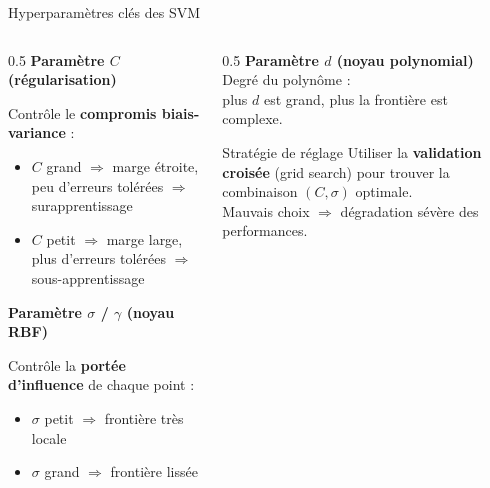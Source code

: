 \documentclass[11pt]{beamer}
\begin{document}
\begin{frame}{Hyperparamètres clés des SVM}
    \small
    \begin{columns}[T]
    \begin{column}{0.5\textwidth}
        \textbf{Paramètre $C$ (régularisation) \\}{\scriptsize
            Contrôle le \textbf{compromis biais-variance} :
            \begin{itemize}
                \item $C$ grand $\Rightarrow$ marge étroite, peu d'erreurs tolérées $\Rightarrow$ surapprentissage
                \item $C$ petit $\Rightarrow$ marge large, plus d'erreurs tolérées $\Rightarrow$ sous-apprentissage
            \end{itemize}}
            
        \vspace{4pt}
        \textbf{Paramètre $\sigma$ / $\gamma$ (noyau RBF) \\}{\scriptsize
            Contrôle la \textbf{portée d'influence} de chaque point :
            \begin{itemize}
                \item $\sigma$ petit $\Rightarrow$ frontière très locale
                \item $\sigma$ grand $\Rightarrow$ frontière lissée
            \end{itemize}}
    \end{column}
    \begin{column}{0.5\textwidth}
        \textbf{Paramètre $d$ (noyau polynomial) \\}{\scriptsize
            Degré du polynôme :\\
            plus $d$ est grand, plus la frontière est complexe.}
            
        \vspace{4pt}
        \begin{alertblock}{Stratégie de réglage}\scriptsize
            Utiliser la \textbf{validation croisée} (grid search) pour trouver la combinaison $(C, \sigma)$ optimale.\\[3pt]
            Mauvais choix $\Rightarrow$ dégradation sévère des performances.
        \end{alertblock}
    \end{column}
    \end{columns}
\end{frame}
\end{document}
